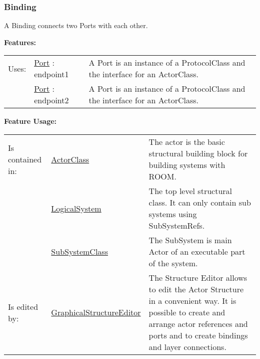 	\vspace{\baselineskip}
	\vspace{\baselineskip}
	\vspace{\baselineskip}
	
	\subsubsection{Binding}
		\hypertarget{ref:Binding}{}
		
		A Binding connects two Ports with each other.
		
		
		
		\begingroup
		\textbf{Features:}
		\renewcommand{\arraystretch}{1.8} %
		\begin{longtable}{l|l p{}}
			\hline
		Uses: & \tabitem \hyperlink{ref:Port}{Port} : endpoint1 & A Port is an instance of a ProtocolClass and the interface for an ActorClass.\\
		& \tabitem \hyperlink{ref:Port}{Port} : endpoint2 & A Port is an instance of a ProtocolClass and the interface for an ActorClass. \\
		\hline
		\end{longtable}
		\endgroup
		
		\begingroup
		\textbf{Feature Usage:}
		\renewcommand{\arraystretch}{1.8} %
		\begin{longtable}{l|l p{}}
			\hline
		Is contained in: & \tabitem \hyperlink{ref:ActorClass}{ActorClass}  & The actor is the basic structural building block for building systems with ROOM.\\
		& \tabitem \hyperlink{ref:LogicalSystem}{LogicalSystem}  & The top level structural class. It can only contain sub systems using SubSystemRefs. \\
		& \tabitem \hyperlink{ref:SubSystemClass}{SubSystemClass}  & The SubSystem is main Actor of an executable part of the system.  \\
		\hline
		Is edited by: & \tabitem \hyperlink{ref:GraphicalStructureEditor}{GraphicalStructureEditor}  & The Structure Editor allows to edit the Actor Structure in a convenient way. It is possible to create and arrange actor references and ports and to create bindings and layer connections.\\
		\hline
		\end{longtable}
		\endgroup
		
		
	\vspace{\baselineskip}
	\vspace{\baselineskip}
	\vspace{\baselineskip}
	
